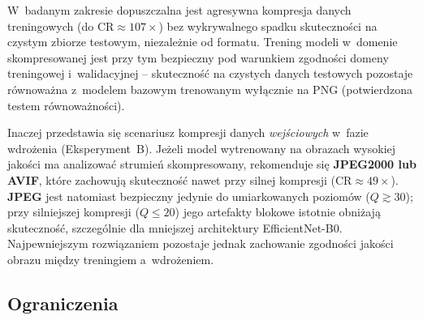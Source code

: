 \documentclass[12pt,a4paper]{article}
\begin{document}
W~badanym zakresie dopuszczalna jest agresywna kompresja danych treningowych (do $\mathrm{CR} \approx 107\times$) bez wykrywalnego spadku skuteczności na czystym zbiorze testowym, niezależnie od formatu. Trening modeli w~domenie skompresowanej jest przy tym bezpieczny pod warunkiem zgodności domeny treningowej i~walidacyjnej -- skuteczność na czystych danych testowych pozostaje równoważna z~modelem bazowym trenowanym wyłącznie na PNG (potwierdzona testem równoważności).

Inaczej przedstawia się scenariusz kompresji danych \emph{wejściowych} w~fazie wdrożenia (Eksperyment~B). Jeżeli model wytrenowany na obrazach wysokiej jakości ma analizować strumień skompresowany, rekomenduje się \textbf{JPEG2000 lub AVIF}, które zachowują skuteczność nawet przy silnej kompresji ($\mathrm{CR}\approx 49\times$). \textbf{JPEG} jest natomiast bezpieczny jedynie do umiarkowanych poziomów ($Q \gtrsim 30$); przy silniejszej kompresji ($Q \le 20$) jego artefakty blokowe istotnie obniżają skuteczność, szczególnie dla mniejszej architektury EfficientNet-B0. Najpewniejszym rozwiązaniem pozostaje jednak zachowanie zgodności jakości obrazu między treningiem a~wdrożeniem.

\subsection{Ograniczenia}
\end{document}

